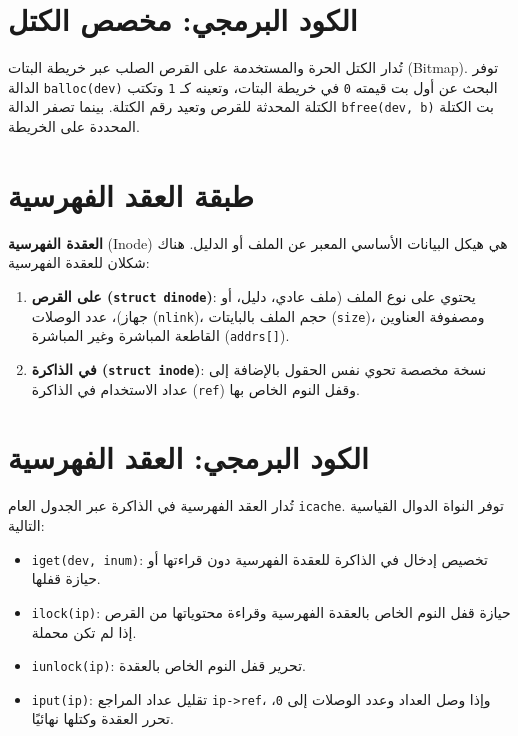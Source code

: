 \section{الكود البرمجي: مخصص الكتل}
\label{sec:code_block_allocator}

تُدار الكتل الحرة والمستخدمة على القرص الصلب عبر خريطة البتات (Bitmap).
توفر الدالة \texttt{balloc(dev)} البحث عن أول بت قيمته \texttt{0} في خريطة البتات، وتعينه كـ \texttt{1} وتكتب الكتلة المحدثة للقرص وتعيد رقم الكتلة. بينما تصفر الدالة \texttt{bfree(dev, b)} بت الكتلة المحددة على الخريطة.

\section{طبقة العقد الفهرسية}
\label{sec:inode_layer}

\textbf{العقدة الفهرسية} (Inode) هي هيكل البيانات الأساسي المعبر عن الملف أو الدليل.
هناك شكلان للعقدة الفهرسية:
\begin{enumerate}
  \item \textbf{على القرص (\texttt{struct dinode})}: يحتوي على نوع الملف (ملف عادي، دليل، أو جهاز)، عدد الوصلات (\texttt{nlink})، حجم الملف بالبايتات (\texttt{size})، ومصفوفة العناوين القاطعة المباشرة وغير المباشرة (\texttt{addrs[]}).
  \item \textbf{في الذاكرة (\texttt{struct inode})}: نسخة مخصصة تحوي نفس الحقول بالإضافة إلى عداد الاستخدام في الذاكرة (\texttt{ref}) وقفل النوم الخاص بها.
\end{enumerate}

\section{الكود البرمجي: العقد الفهرسية}
\label{sec:code_inodes}

تُدار العقد الفهرسية في الذاكرة عبر الجدول العام \texttt{icache}.
توفر النواة الدوال القياسية التالية:
\begin{itemize}
  \item \texttt{iget(dev, inum)}: تخصيص إدخال في الذاكرة للعقدة الفهرسية دون قراءتها أو حيازة قفلها.
  \item \texttt{ilock(ip)}: حيازة قفل النوم الخاص بالعقدة الفهرسية وقراءة محتوياتها من القرص إذا لم تكن محملة.
  \item \texttt{iunlock(ip)}: تحرير قفل النوم الخاص بالعقدة.
  \item \texttt{iput(ip)}: تقليل عداد المراجع \texttt{ip->ref}، وإذا وصل العداد وعدد الوصلات إلى \texttt{0}، تحرر العقدة وكتلها نهائيًا.
\end{itemize}


